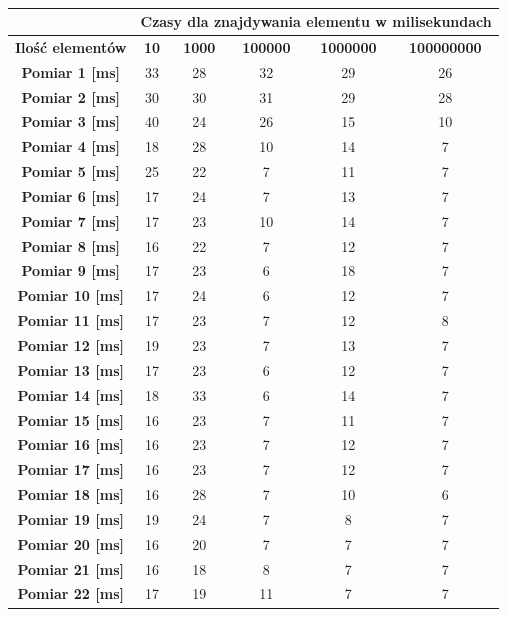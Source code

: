 \documentclass[11pt,a4paper]{article}
\begin{document}
\begin{table}[htbp]
\caption{}
\begin{center}
\begin{tabular}{|c|c|c|c|c|c|}
\hline
\textbf{} & \multicolumn{ 5}{c|}{\textbf{Czasy dla znajdywania elementu w milisekundach}} \\ \hline
\textbf{Ilość elementów} & \textbf{10} & \textbf{1000} & \textbf{100000} & \textbf{1000000} & \textbf{100000000} \\ \hline
\textbf{Pomiar 1 [ms]} & 33 & 28 & 32 & 29 & 26 \\ \hline
\textbf{Pomiar 2 [ms]} & 30 & 30 & 31 & 29 & 28 \\ \hline
\textbf{Pomiar 3 [ms]} & 40 & 24 & 26 & 15 & 10 \\ \hline
\textbf{Pomiar 4 [ms]} & 18 & 28 & 10 & 14 & 7 \\ \hline
\textbf{Pomiar 5 [ms]} & 25 & 22 & 7 & 11 & 7 \\ \hline
\textbf{Pomiar 6 [ms]} & 17 & 24 & 7 & 13 & 7 \\ \hline
\textbf{Pomiar 7 [ms]} & 17 & 23 & 10 & 14 & 7 \\ \hline
\textbf{Pomiar 8 [ms]} & 16 & 22 & 7 & 12 & 7 \\ \hline
\textbf{Pomiar 9 [ms]} & 17 & 23 & 6 & 18 & 7 \\ \hline
\textbf{Pomiar 10 [ms]} & 17 & 24 & 6 & 12 & 7 \\ \hline
\textbf{Pomiar 11 [ms]} & 17 & 23 & 7 & 12 & 8 \\ \hline
\textbf{Pomiar 12 [ms]} & 19 & 23 & 7 & 13 & 7 \\ \hline
\textbf{Pomiar 13 [ms]} & 17 & 23 & 6 & 12 & 7 \\ \hline
\textbf{Pomiar 14 [ms]} & 18 & 33 & 6 & 14 & 7 \\ \hline
\textbf{Pomiar 15 [ms]} & 16 & 23 & 7 & 11 & 7 \\ \hline
\textbf{Pomiar 16 [ms]} & 16 & 23 & 7 & 12 & 7 \\ \hline
\textbf{Pomiar 17 [ms]} & 16 & 23 & 7 & 12 & 7 \\ \hline
\textbf{Pomiar 18 [ms]} & 16 & 28 & 7 & 10 & 6 \\ \hline
\textbf{Pomiar 19 [ms]} & 19 & 24 & 7 & 8 & 7 \\ \hline
\textbf{Pomiar 20 [ms]} & 16 & 20 & 7 & 7 & 7 \\ \hline
\textbf{Pomiar 21 [ms]} & 16 & 18 & 8 & 7 & 7 \\ \hline
\textbf{Pomiar 22 [ms]} & 17 & 19 & 11 & 7 & 7 \\ \hline

\end{tabular}
\end{center}
\end{table}
\end{document}
